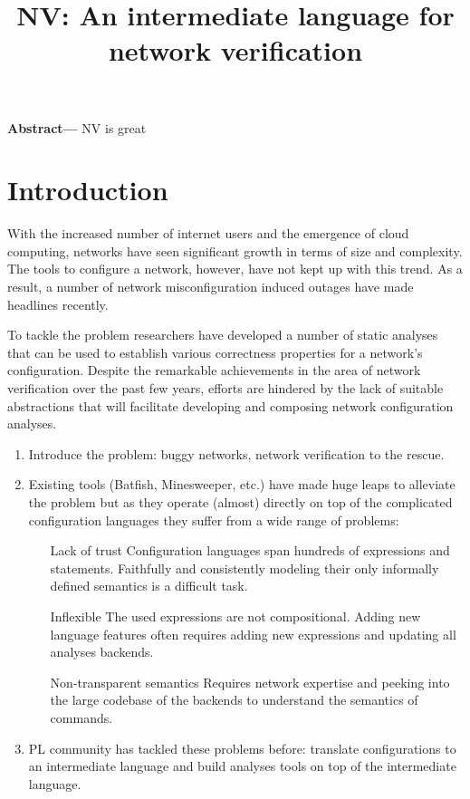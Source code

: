 \documentclass[sigconf,10pt]{acmart}
\begin{document}
\title{NV: An intermediate language for network verification}


\maketitle

%
%
%
%

\textbf{Abstract---}
NV is great

%
%
%
%

\section{Introduction} 
\label{sec:introduction}

With the increased number of internet users and the emergence of cloud
computing, networks have seen significant growth in terms of size and
complexity. The tools to configure a network, however, have not kept up with
this trend. As a result, a number of network misconfiguration induced outages
have made headlines recently.

To tackle the problem researchers have developed a number of static analyses
that can be used to establish various correctness properties for a network's
configuration. Despite the remarkable achievements in the area of network
verification over the past few years, efforts are hindered by the lack of
suitable abstractions that will facilitate developing and composing network configuration analyses.



\begin{enumerate}
  \item Introduce the problem: buggy networks, network verification to the rescue.
  \item Existing tools (Batfish, Minesweeper, etc.) have made huge leaps to alleviate the problem but as they operate (almost) directly on top of the complicated configuration languages they suffer from a wide range of problems:
    \begin{itemize}
      \item[Lack of trust] Configuration languages span hundreds of expressions and statements. Faithfully and consistently modeling their only informally defined semantics is a difficult task.
      \item[Inflexible] The used expressions are not compositional. Adding new language features often requires adding new expressions and updating all analyses backends.
      \item[Non-transparent semantics] Requires network expertise and peeking into the large codebase of the backends to understand the semantics of commands.
    \end{itemize}
  \item PL community has tackled these problems before: translate configurations to an intermediate language and build analyses tools on top of the intermediate language.
\end{enumerate}
\end{document}
